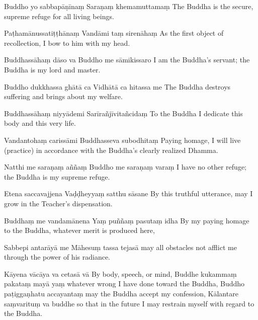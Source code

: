 \begin{chantsubsection}
  \chantlinepair
    {Buddho yo sabbapāṇīnaṃ}
    {Saraṇaṃ khemamuttamaṃ}
    {The Buddha is the secure, supreme refuge for all living beings.}

  \chantlinepair
    {Paṭhamānussatiṭṭhānaṃ}
    {Vandāmi taṃ sirenāhaṃ}
    {As the first object of recollection, I bow to him with my head.}

  \chantlinepair
    {Buddhassāhaṃ dāso\footnotemark{} va}
    {Buddho me sāmikissaro}
    {I am the Buddha's servant; the Buddha is my lord and master.}

  \chantlinepair
    {Buddho dukkhassa ghātā ca}
    {Vidhātā ca hitassa me}
    {The Buddha destroys suffering and brings about my welfare.}

  \chantlinepair
    {Buddhassāhaṃ niyyādemi}
    {Sarīrañjīvitañcidaṃ}
    {To the Buddha I dedicate this body and this very life.}

  \chantlinepair
    {Vandantohaṃ\footnotemark{} carissāmi}
    {Buddhasseva subodhitaṃ}
    {Paying homage, I will live (practice) in accordance with the Buddha’s clearly realized Dhamma.}

  \chantlinepair
    {Natthi me saraṇaṃ aññaṃ}
    {Buddho me saraṇaṃ varaṃ}
    {I have no other refuge; the Buddha is my supreme refuge.}

  \chantlinepair
    {Etena saccavajjena}
    {Vaḍḍheyyaṃ satthu sāsane}
    {By this truthful utterance, may I grow in the Teacher’s dispensation.}

  \chantlinepair
    {Buddhaṃ me vandamānena\footnotemark{}}
    {Yaṃ puññaṃ pasutaṃ idha}
    {By my paying homage to the Buddha, whatever merit is produced here,}

  \chantlinepair
    {Sabbepi antarāyā me}
    {Māhesuṃ tassa tejasā}
    {may all obstacles not afflict me through the power of his radiance.}
\end{chantsubsection}

\newpage

\begin{chantsubsection}
\end{chantsubsection}

\begin{chantsubsection}
  \chantline
    {Kāyena vācāya va cetasā vā}
    {By body, speech, or mind,}
  \chantline
    {Buddhe kukammaṃ pakataṃ mayā yaṃ}
    {whatever wrong I have done toward the Buddha,}
  \chantline
    {Buddho paṭiggaṇhatu accayantaṃ}
    {may the Buddha accept my confession,}
  \chantline
    {Kālantare saṃvarituṃ va buddhe}
    {so that in the future I may restrain myself with regard to the Buddha.}
\end{chantsubsection}
